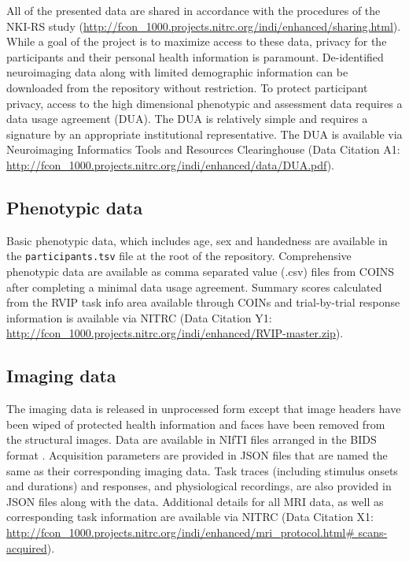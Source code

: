 All of the presented data are shared in accordance with the procedures of the NKI-RS study (\url{http://fcon\_1000.projects.nitrc.org/indi/enhanced/sharing.html}). While a goal of the project is to maximize access to these data, privacy for the participants and their personal health information is paramount. De-identified neuroimaging data along with limited demographic information can be downloaded from the repository without restriction. To protect participant privacy, access to the high dimensional phenotypic and assessment data requires a data usage agreement (DUA). The DUA is relatively simple and requires a signature by an appropriate institutional representative. The DUA is available via Neuroimaging Informatics Tools and Resources Clearinghouse (Data Citation A1: \url{http://fcon\_1000.projects.nitrc.org/indi/enhanced/data/DUA.pdf}).

\subsection{Phenotypic data}
Basic phenotypic data, which includes age, sex and handedness are available in the \texttt{participants.tsv} file at the root of the repository. Comprehensive phenotypic data are available as comma separated value (.csv) files from COINS after completing a minimal data usage agreement. Summary scores calculated from the RVIP task info area available through COINs and trial-by-trial response information is available via NITRC (Data Citation Y1: \url{http://fcon\_1000.projects.nitrc.org/indi/enhanced/RVIP-master.zip}).

\subsection{Imaging data}
The imaging data is released in unprocessed form except that image headers have been wiped of protected health information and faces have been removed from the structural images. Data are available in NIfTI files arranged in the BIDS format \cite{Gorgolewski2016}. Acquisition parameters are provided in JSON files that are named the same as their corresponding imaging data. Task traces (including stimulus onsets and durations) and responses, and physiological recordings, are also provided in JSON files along with the data. Additional details for all MRI data, as well as corresponding task information are available via NITRC (Data Citation X1: \url{http://fcon\_1000.projects.nitrc.org/indi/enhanced/mri\_protocol.html\# scans-acquired}).

